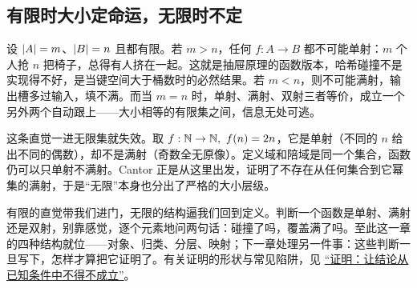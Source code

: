 \subsection{有限时大小定命运，无限时不定}

设 \(\left|A\right|=m\)、\(\left|B\right|=n\) 且都有限。若 \(m>n\)，任何 \(f:A\to B\) 都不可能单射：\(m\) 个人抢 \(n\) 把椅子，总得有人挤在一起。这就是抽屉原理的函数版本，哈希碰撞不是实现得不好，是当键空间大于桶数时的必然结果。若 \(m<n\)，则不可能满射，输出槽多过输入，填不满。而当 \(m=n\) 时，单射、满射、双射三者等价，成立一个另外两个自动跟上——大小相等的有限集之间，信息无处可逃。

这条直觉一进无限集就失效。取 \(f:\N\to\N,\ f(n)=2n\)，它是单射（不同的 \(n\) 给出不同的偶数），却不是满射（奇数全无原像）。定义域和陪域是同一个集合，函数仍可以只单射不满射。Cantor 正是从这里出发，证明了不存在从任何集合到它幂集的满射，于是``无限''本身也分出了严格的大小层级。

有限的直觉带我们进门，无限的结构逼我们回到定义。判断一个函数是单射、满射还是双射，别靠感觉，逐个元素地问两句话：碰撞了吗，覆盖满了吗。至此这一章的四种结构就位——对象、归类、分层、映射；下一章处理另一件事：这些判断一旦写下，怎样才算把它证明了。有关证明的形状与常见陷阱，见 \hyperref[ch:006]{``证明：让结论从已知条件中不得不成立''}。
